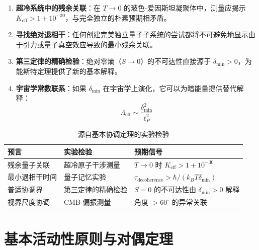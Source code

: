 \documentclass[11pt,a4paper]{article}
\begin{document}
	\begin{enumerate}
		\item \textbf{超冷系统中的残余关联}：在 $T \to 0$ 的玻色-爱因斯坦凝聚体中，测量应揭示 $K_{\mathrm{eff}} > 1 + 10^{-30}$，与完全独立的朴素预期相矛盾。
		
		\item \textbf{寻找绝对退相干}：任何创建完美独立量子子系统的尝试都将不可避免地显示由于引力或量子真空效应导致的最小残余关联。
		
		\item \textbf{第三定律的精确检验}：绝对零熵（$S \to 0$）的不可达性直接源于 $\delta_{\min} > 0$，为能斯特定理提供了新的基本解释。
		
		\item \textbf{宇宙学常数联系}：如果 $\delta_{\min}$ 在宇宙学上演化，它可以为暗能量提供替代解释：
		\begin{equation}
			\Lambda_{\mathrm{eff}} \sim \frac{\delta_{\min}^2}{\ell_P^2}
		\end{equation}
	\end{enumerate}
	
	\begin{table}[htbp]
		\centering
		\small
		\begin{tabular}{p{}p{}p{}}
			\toprule
			\textbf{预言} & \textbf{实验检验} & \textbf{预期信号} \\
			\midrule
			残余量子关联 & 超冷原子干涉测量 & $T \to 0$ 时 $K_{\mathrm{eff}} > 1 + 10^{-30}$ \\
			最小退相干时间 & 量子记忆实验 & $\tau_{\text{decoherence}} > \hbar/(k_B T \delta_{\min})$ \\
			普适协调界 & 第三定律的精确检验 & $S=0$ 的不可达性由 $\delta_{\min}>0$ 解释 \\
			视界尺度协调 & CMB 偏振测量 & 角度 $>60^\circ$ 的异常关联 \\
			\bottomrule
		\end{tabular}
		\caption{源自基本协调定理的实验检验}
		\label{tab:theorem-predictions}
	\end{table}
	
	
	\section{基本活动性原则与对偶定理}
	\label{sec:activity_principle}
	
\end{document}
